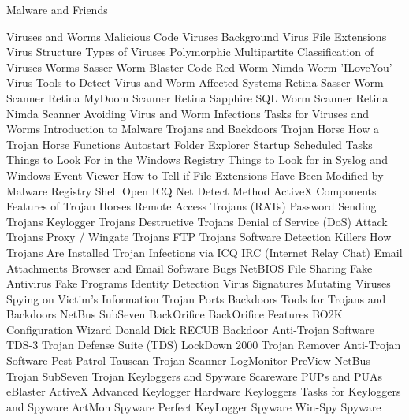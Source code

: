 Malware and Friends

Viruses and Worms
Malicious Code
Viruses
Background
Virus File Extensions
Virus Structure
Types of Viruses
	Polymorphic
	Multipartite
Classification of Viruses
Worms
	Sasser Worm
	Blaster
	Code Red Worm
	Nimda Worm
'ILoveYou' Virus
Tools to Detect Virus and Worm-Affected Systems
Retina Sasser Worm Scanner
Retina MyDoom Scanner
Retina Sapphire SQL Worm Scanner
Retina Nimda Scanner
Avoiding Virus and Worm Infections
Tasks for Viruses and Worms
Introduction to Malware
Trojans and Backdoors
Trojan Horse
How a Trojan Horse Functions
Autostart Folder
Explorer Startup
Scheduled Tasks
Things to Look For in the Windows Registry
Things to Look for in Syslog and Windows Event Viewer
How to Tell if File Extensions Have Been Modified by Malware
Registry Shell Open
ICQ Net Detect Method
ActiveX Components
Features of Trojan Horses
Remote Access Trojans (RATs)
Password Sending Trojans
Keylogger Trojans
Destructive Trojans
Denial of Service (DoS) Attack Trojans
Proxy / Wingate Trojans
FTP Trojans
Software Detection Killers
How Trojans Are Installed
Trojan Infections via ICQ
IRC (Internet Relay Chat)
Email Attachments
Browser and Email Software Bugs
NetBIOS File Sharing
Fake Antivirus
Fake Programs
Identity Detection
Virus Signatures
Mutating Viruses
Spying on Victim's Information
Trojan Ports
Backdoors
Tools for Trojans and Backdoors
NetBus
SubSeven
BackOrifice
BackOrifice Features
BO2K Configuration Wizard
Donald Dick
RECUB Backdoor
Anti-Trojan Software
TDS-3 Trojan Defense Suite (TDS)
LockDown 2000
Trojan Remover Anti-Trojan Software
Pest Patrol
Tauscan Trojan Scanner
LogMonitor
PreView
NetBus Trojan
SubSeven Trojan
Keyloggers and Spyware
Scareware
PUPs and PUAs
eBlaster
ActiveX Advanced Keylogger
Hardware Keyloggers
Tasks for Keyloggers and Spyware
ActMon Spyware
Perfect KeyLogger Spyware
Win-Spy Spyware
